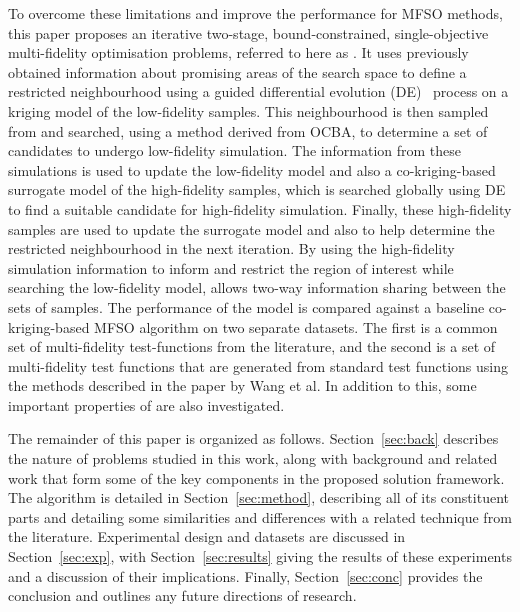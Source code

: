 
To overcome these limitations and improve the performance for MFSO methods, this paper proposes an iterative two-stage, bound-constrained, single-objective multi-fidelity optimisation problems, referred to here as \AlgName{}. It uses previously obtained information about promising areas of the search space to define a restricted neighbourhood using a guided differential evolution (DE)~\cite{storn1997differential} process on a kriging model of the low-fidelity samples. This neighbourhood is then sampled from and searched, using a method derived from OCBA, to determine a set of candidates to undergo low-fidelity simulation. The information from these simulations is used to update the low-fidelity model and also a co-kriging-based surrogate model of the high-fidelity samples, which is searched globally using DE to find a suitable candidate for high-fidelity simulation. Finally, these high-fidelity samples are used to update the surrogate model and also to help determine the restricted neighbourhood in the next iteration. By using the high-fidelity simulation information to inform and restrict the region of interest while searching the low-fidelity model, \AlgName{} allows two-way information sharing between the sets of samples. The performance of the \AlgName{} model is compared against a baseline co-kriging-based MFSO algorithm on two separate datasets. The first is a common set of multi-fidelity test-functions from the literature, and the second is a set of multi-fidelity test functions that are generated from standard test functions using the methods described in the paper by Wang et al. In addition to this, some important properties of \AlgName{} are also investigated.

The remainder of this paper is organized as follows. Section~\ref{sec:back} describes the nature of problems studied in this work, along with background and related work that form some of the key components in the proposed solution framework. The \AlgName{} algorithm is detailed in Section~\ref{sec:method}, describing all of its constituent parts and detailing some similarities and differences with a related technique from the literature. Experimental design and datasets are discussed in Section~\ref{sec:exp}, with Section~\ref{sec:results} giving the results of these experiments and a discussion of their implications. Finally, Section~\ref{sec:conc} provides the conclusion and outlines any future directions of research.

